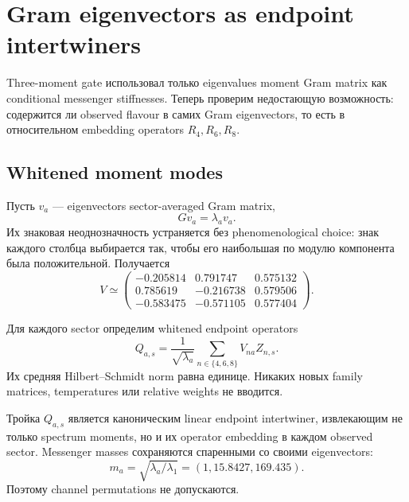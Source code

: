 \chapter{Gram eigenvectors as endpoint intertwiners}

Three-moment gate использовал только eigenvalues moment Gram matrix как
conditional messenger stiffnesses. Теперь проверим недостающую возможность:
содержится ли observed flavour в самих Gram eigenvectors, то есть в
относительном embedding operators $R_4,R_6,R_8$.

\section{Whitened moment modes}

Пусть $v_a$ --- eigenvectors sector-averaged Gram matrix,
\begin{equation}
 Gv_a=\lambda_av_a.
\end{equation}
Их знаковая неоднозначность устраняется без phenomenological choice: знак
каждого столбца выбирается так, чтобы его наибольшая по модулю компонента была
положительной. Получается
\begin{equation}
 V\simeq
 \begin{pmatrix}
 -0.205814&0.791747&0.575132\\
 0.785619&-0.216738&0.579506\\
 -0.583475&-0.571105&0.577404
 \end{pmatrix}.
\end{equation}

Для каждого sector определим whitened endpoint operators
\begin{equation}
 Q_{a,s}=\frac1{\sqrt{\lambda_a}}
 \sum_{n\in\{4,6,8\}}V_{n a}Z_{n,s}.
\end{equation}
Их средняя Hilbert--Schmidt norm равна единице. Никаких новых family matrices,
temperatures или relative weights не вводится.

\begin{proposition}
Тройка $Q_{a,s}$ является каноническим linear endpoint intertwiner,
извлекающим не только spectrum moments, но и их operator embedding в каждом
observed sector. Messenger masses сохраняются спаренными со своими
eigenvectors:
\begin{equation}
 m_a=\sqrt{\lambda_a/\lambda_1}
 =(1,15.8427,169.435).
\end{equation}
Поэтому channel permutations не допускаются.
\end{proposition}

